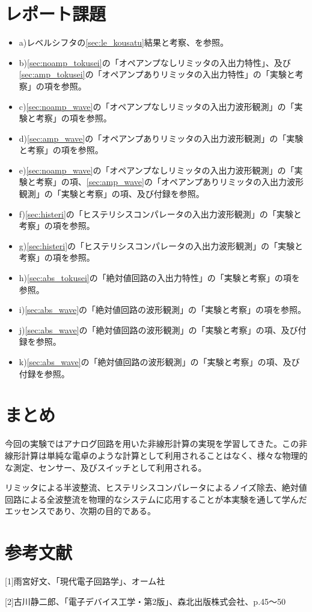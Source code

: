 \documentclass[11pt,a4j]{jsarticle}
\begin{document}
 \section{レポート課題} 
  \begin{itemize}
  \item a)レベルシフタの\ref{sec:le_kousatu}結果と考察、を参照。
  \item b)\ref{sec:noamp_tokusei}の「オペアンプなしリミッタの入出力特性」、及び\ref{sec:amp_tokusei}の「オペアンプありリミッタの入出力特性」の「実験と考察」の項を参照。
  \item c)\ref{sec:noamp_wave}の「オペアンプなしリミッタの入出力波形観測」の「実験と考察」の項を参照。
  \item d)\ref{sec:amp_wave}の「オペアンプありリミッタの入出力波形観測」の「実験と考察」の項を参照。
  \item e)\ref{sec:noamp_wave}の「オペアンプなしリミッタの入出力波形観測」の「実験と考察」の項、\ref{sec:amp_wave}の「オペアンプありリミッタの入出力波形観測」の「実験と考察」の項、及び付録を参照。
  \item f)\ref{sec:histeri}の「ヒステリシスコンパレータの入出力波形観測」の「実験と考察」の項を参照。
  \item g)\ref{sec:histeri}の「ヒステリシスコンパレータの入出力波形観測」の「実験と考察」の項を参照。
  \item h)\ref{sec:abs_tokusei}の「絶対値回路の入出力特性」の「実験と考察」の項を参照。
  \item i)\ref{sec:abs_wave}の「絶対値回路の波形観測」の「実験と考察」の項を参照。
  \item j)\ref{sec:abs_wave}の「絶対値回路の波形観測」の「実験と考察」の項、及び付録を参照。
  \item k)\ref{sec:abs_wave}の「絶対値回路の波形観測」の「実験と考察」の項、及び付録を参照。
  \end{itemize}
  
  \section{まとめ}
  今回の実験ではアナログ回路を用いた非線形計算の実現を学習してきた。この非線形計算は単純な電卓のような計算として利用されることはなく、様々な物理的な測定、センサー、及びスイッチとして利用される。
  
  リミッタによる半波整流、ヒステリシスコンパレータによるノイズ除去、絶対値回路による全波整流を物理的なシステムに応用することが本実験を通して学んだエッセンスであり、次期の目的である。
  
 \section{参考文献}
  [1]雨宮好文、「現代電子回路学」、オーム社
  
  [2]古川静二郎、「電子デバイス工学・第2版」、森北出版株式会社、p.45～50
  
  
\end{document}
